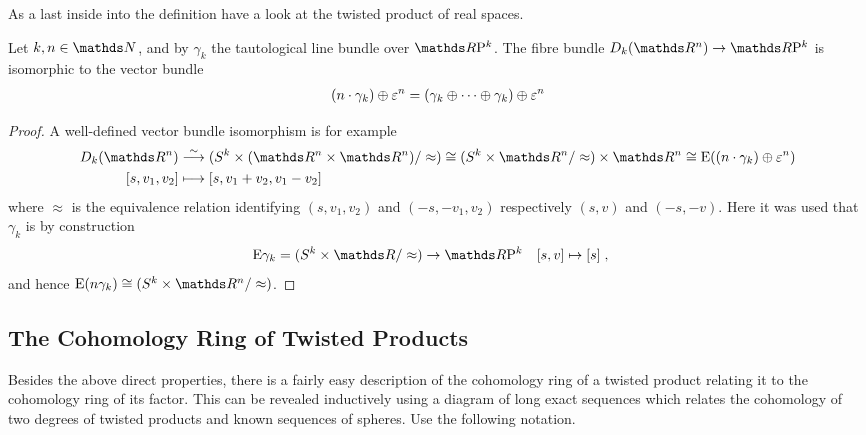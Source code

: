As a last inside into the definition have a look at the twisted
product of real spaces.
\begin{Lem}\label{lem:twistedprodrealspace}
  Let $k, n\in\Nat$,
  and by $\gamma_k$ the tautological line bundle over
  $\RP k$.
  The fibre bundle $\Twistedprod{k}{\R^n}\to \RP k$ is isomorphic to
  the vector bundle
  \begin{gather*}
    (n\cdot\gamma_k)\oplus\varepsilon^n
    = (\gamma_k\oplus\dotsb\oplus\gamma_k)\oplus\varepsilon^n
  \end{gather*}
  \begin{proof}
    A well-defined vector bundle isomorphism is for example
    \begin{align*}
      \Twistedprod{k}{\R^n}
      &\overset{\sim}\longto
        (\Twistedprodcovspace{k}{\R^n}/\approx)
        \cong (\Sphere{k}\times\R^n/\approx)\times\R^n
        \cong \E{((n\cdot\gamma_k)\oplus\trivbdl^n)}
      \\
      [s, v_1, v_2]
      &\longmapsto
        [s, v_1+v_2, v_1-v_2]
    \end{align*}
    where $\approx$ is the equivalence relation identifying
    $(s,v_1,v_2)$ and $(-s,-v_1,v_2)$ respectively $(s,v)$ and
    $(-s,-v)$.
    Here it was used that $\gamma_k$ is by
    construction
    \begin{align*}
      \E{\gamma_k} = (\Sphere k\times\R/\approx) &\to \RP k
      &[s,v] &\mapsto [s]
               \;,
    \end{align*}
    and hence
    $\E{(n\gamma_k)}\cong(\Sphere k \times\R^n/\approx)$.
  \end{proof}
\end{Lem}

\subsection{The Cohomology Ring of Twisted Products}
Besides the above direct properties, there is a fairly easy
description of the cohomology ring of a twisted product relating it to
the cohomology ring of its factor.
This can be revealed inductively using a diagram of long exact
sequences which relates the cohomology of two degrees of twisted
products and known sequences of spheres.
Use the following notation.

